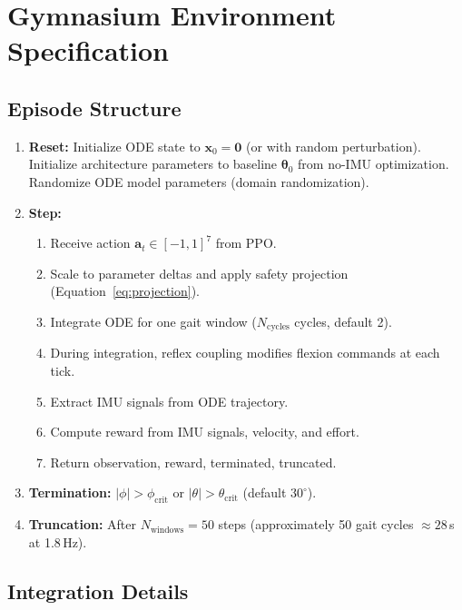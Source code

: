 \documentclass[11pt]{article}
\begin{document}
\section{Gymnasium Environment Specification}
\label{sec:env}

\subsection{Episode Structure}

\begin{enumerate}
    \item \textbf{Reset:} Initialize ODE state to $\mathbf{x}_0 = \mathbf{0}$ (or with random perturbation). Initialize architecture parameters to baseline $\boldsymbol{\theta}_0$ from no-IMU optimization. Randomize ODE model parameters (domain randomization).
    \item \textbf{Step:} 
    \begin{enumerate}
        \item Receive action $\mathbf{a}_t \in [-1,1]^7$ from PPO.
        \item Scale to parameter deltas and apply safety projection (Equation~\eqref{eq:projection}).
        \item Integrate ODE for one gait window ($N_{\mathrm{cycles}}$ cycles, default 2).
        \item During integration, reflex coupling modifies flexion commands at each tick.
        \item Extract IMU signals from ODE trajectory.
        \item Compute reward from IMU signals, velocity, and effort.
        \item Return observation, reward, terminated, truncated.
    \end{enumerate}
    \item \textbf{Termination:} $|\phi| > \phi_{\mathrm{crit}}$ or $|\theta| > \theta_{\mathrm{crit}}$ (default $30^\circ$).
    \item \textbf{Truncation:} After $N_{\mathrm{windows}} = 50$ steps (approximately 50 gait cycles $\approx 28$\,s at 1.8\,Hz).
\end{enumerate}

\subsection{Integration Details}
\end{document}

